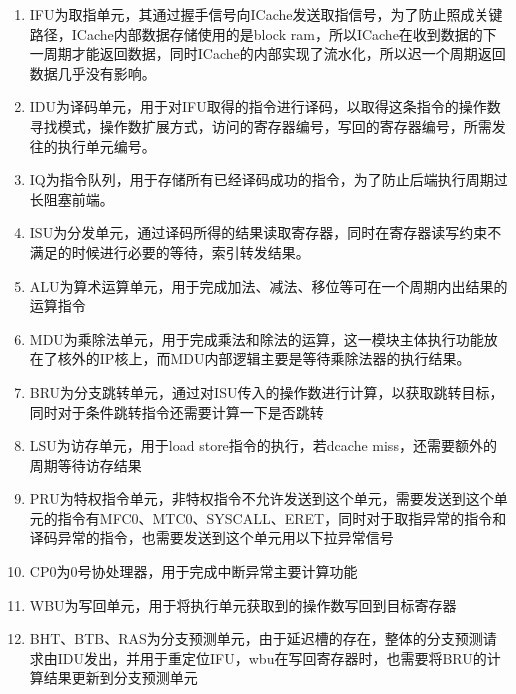 \documentclass[lang=cn,11pt,a4paper]{elegantpaper}
\begin{document}
\begin{enumerate}
\item IFU为取指单元，其通过握手信号向ICache发送取指信号，为了防止照成关键路径，ICache内部数据存储使用的是block ram，所以ICache在收到数据的下一周期才能返回数据，同时ICache的内部实现了流水化，所以迟一个周期返回数据几乎没有影响。

\item IDU为译码单元，用于对IFU取得的指令进行译码，以取得这条指令的操作数寻找模式，操作数扩展方式，访问的寄存器编号，写回的寄存器编号，所需发往的执行单元编号。

\item IQ为指令队列，用于存储所有已经译码成功的指令，为了防止后端执行周期过长阻塞前端。

\item ISU为分发单元，通过译码所得的结果读取寄存器，同时在寄存器读写约束不满足的时候进行必要的等待，索引转发结果。

\item ALU为算术运算单元，用于完成加法、减法、移位等可在一个周期内出结果的运算指令

\item MDU为乘除法单元，用于完成乘法和除法的运算，这一模块主体执行功能放在了核外的IP核上，而MDU内部逻辑主要是等待乘除法器的执行结果。

\item BRU为分支跳转单元，通过对ISU传入的操作数进行计算，以获取跳转目标，同时对于条件跳转指令还需要计算一下是否跳转

\item LSU为访存单元，用于load store指令的执行，若dcache miss，还需要额外的周期等待访存结果

\item PRU为特权指令单元，非特权指令不允许发送到这个单元，需要发送到这个单元的指令有MFC0、MTC0、SYSCALL、ERET，同时对于取指异常的指令和译码异常的指令，也需要发送到这个单元用以下拉异常信号

\item CP0为0号协处理器，用于完成中断异常主要计算功能

\item WBU为写回单元，用于将执行单元获取到的操作数写回到目标寄存器

\item BHT、BTB、RAS为分支预测单元，由于延迟槽的存在，整体的分支预测请求由IDU发出，并用于重定位IFU，wbu在写回寄存器时，也需要将BRU的计算结果更新到分支预测单元
\end{enumerate}

\newpage

%
%
\end{document}
